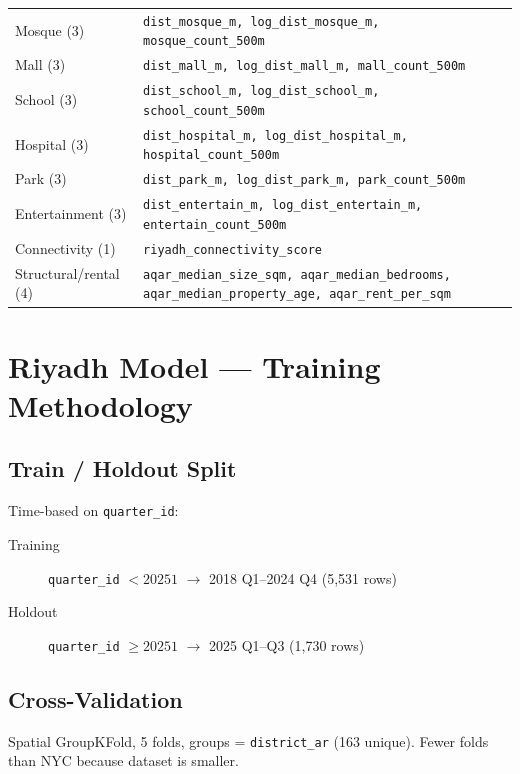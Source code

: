 \documentclass[11pt, a4paper, twoside]{report}
\begin{document}
\begin{longtable}{lp{10cm}}
  Mosque (3)              & \texttt{dist\_mosque\_m, log\_dist\_mosque\_m, mosque\_count\_500m} \\
  Mall (3)                & \texttt{dist\_mall\_m, log\_dist\_mall\_m, mall\_count\_500m} \\
  School (3)              & \texttt{dist\_school\_m, log\_dist\_school\_m, school\_count\_500m} \\
  Hospital (3)            & \texttt{dist\_hospital\_m, log\_dist\_hospital\_m, hospital\_count\_500m} \\
  Park (3)                & \texttt{dist\_park\_m, log\_dist\_park\_m, park\_count\_500m} \\
  Entertainment (3)       & \texttt{dist\_entertain\_m, log\_dist\_entertain\_m, entertain\_count\_500m} \\
  Connectivity (1)        & \texttt{riyadh\_connectivity\_score} \\
  Structural/rental (4)   & \texttt{aqar\_median\_size\_sqm, aqar\_median\_bedrooms, aqar\_median\_property\_age, aqar\_rent\_per\_sqm} \\
\end{longtable}

\chapter{Riyadh Model --- Training Methodology}
\label{ch:riyadh_training}

\section{Train / Holdout Split}
Time-based on \texttt{quarter\_id}:
\begin{description}
  \item[Training] \texttt{quarter\_id} $< 20251$ $\to$ 2018 Q1--2024 Q4 (5,531 rows)
  \item[Holdout]  \texttt{quarter\_id} $\geq 20251$ $\to$ 2025 Q1--Q3 (1,730 rows)
\end{description}

\section{Cross-Validation}
Spatial GroupKFold, 5 folds, groups = \texttt{district\_ar} (163 unique). Fewer
folds than NYC because dataset is smaller.
\end{document}
